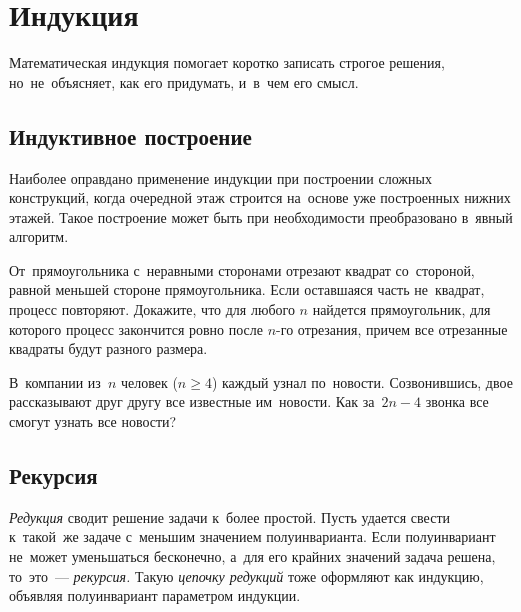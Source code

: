 
\section*{Индукция}



Математическая индукция помогает коротко записать строгое решения,
но~не~объясняет, как его придумать, и~в~чем его смысл.

\subsection*{Индуктивное построение}

Наиболее оправдано применение индукции при построении сложных конструкций,
когда очередной этаж строится на~основе уже построенных нижних этажей.
Такое построение может быть при необходимости преобразовано в~явный алгоритм.

\begin{problems}

\item
От~прямоугольника с~неравными сторонами отрезают квадрат со~стороной, равной
меньшей стороне прямоугольника.
Если оставшаяся часть не~квадрат, процесс повторяют.
Докажите, что для любого $n$ найдется прямоугольник, для которого процесс
закончится ровно после $n$-го отрезания, причем все отрезанные квадраты будут
разного размера.

\item
В~компании из~$n$ человек ($n \geq 4$) каждый узнал по~новости.
Созвонившись, двое рассказывают друг другу все известные им~новости.
Как за~$2 n - 4$ звонка все смогут узнать все новости?

\end{problems}

\subsection*{Рекурсия}

\emph{Редукция} сводит решение задачи к~более простой.
Пусть удается свести к~такой~же задаче с~меньшим значением полуинварианта.
Если полуинвариант не~может уменьшаться бесконечно, а~для его крайних значений
задача решена, то~это~— \emph{рекурсия.}
Такую \emph{цепочку редукций} тоже оформляют как индукцию, объявляя
полуинвариант параметром индукции.

